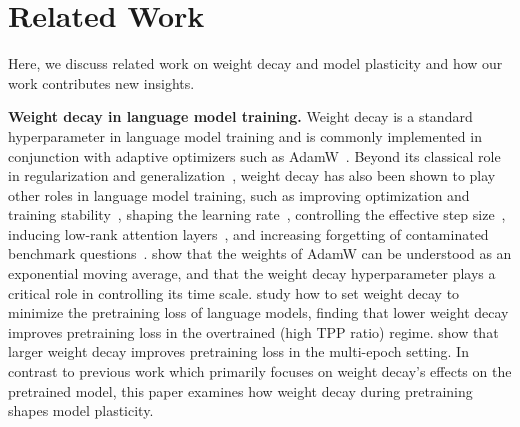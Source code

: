 \section{Related Work}
\label{sec:related}


Here, we discuss related work on weight decay and model plasticity and how our work contributes new insights.

\textbf{Weight decay in language model training.}
Weight decay is a standard hyperparameter in language model training and is commonly implemented in conjunction with adaptive optimizers such as AdamW~\citep{loshchilov2019decoupled, brown2020language, grattafiori2024llama, olmo2024olmo2, liu2024deepseekv3}.
Beyond its classical role in regularization and generalization~\citep{krogh1991simple,zhang2018three,loshchilov2019decoupled,zhou2024towards}, weight decay has also been shown to play other roles in language model training, such as improving optimization and training stability~\citep{andriushchenko2023whywd}, shaping the learning rate~\citep{li2020reconciling,kosson2024rotational,kosson2025weight}, controlling the effective step size~\citep{wen2025hyperball}, inducing low-rank attention layers~\citep{kobayashi2024wdlowrank}, and increasing forgetting of contaminated benchmark questions~\citep{bordt2025datacontam}. \citet{wang2024set} show that the weights of AdamW can be understood as an exponential moving average, and that the weight decay hyperparameter plays a critical role in controlling its time scale. \citet{bergsma2505powerlines} study how to set weight decay to minimize the pretraining loss of language models, finding that lower weight decay improves pretraining loss in the overtrained (high TPP ratio) regime. \citet{kim2025ptunderinfcompute} show that larger weight decay improves pretraining loss in the multi-epoch setting. In contrast to previous work which primarily focuses on weight decay's effects on the pretrained model, this paper examines how weight decay during pretraining shapes model plasticity. %




